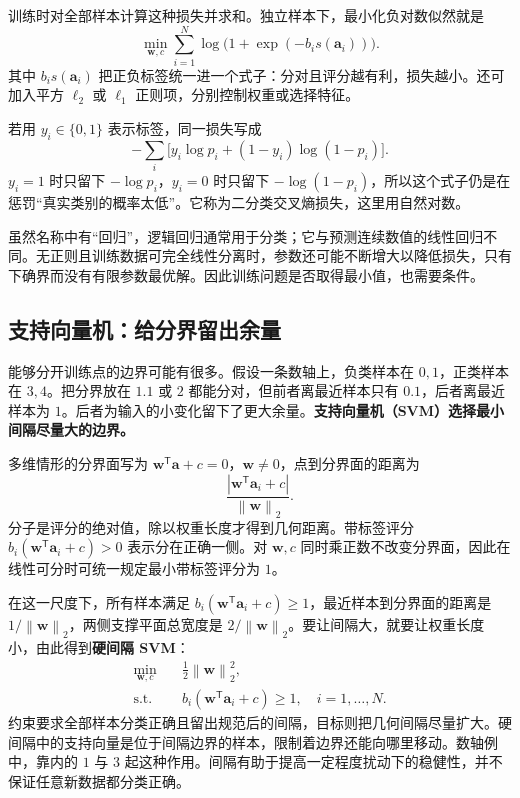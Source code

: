 \documentclass[UTF8,fontset=fandol,a4paper,12pt]{ctexart}
\newcommand{\va}{\boldsymbol a}
\newcommand{\vw}{\boldsymbol w}
\newcommand{\norm}[1]{\left\lVert#1\right\rVert}
\theoremstyle{definition}
\begin{document}
训练时对全部样本计算这种损失并求和。独立样本下，最小化负对数似然就是
\begin{equation}\label{eq:logistic}
 \boxed{\min_{\vw,c}\sum_{i=1}^N\log\bigl(1+\exp(-b_i s(\va_i))\bigr).}
\end{equation}
其中 $b_i s(\va_i)$ 把正负标签统一进一个式子：分对且评分越有利，损失越小。还可加入平方 $\ell_2$ 或 $\ell_1$ 正则项，分别控制权重或选择特征。

若用 $y_i\in\{0,1\}$ 表示标签，同一损失写成
\[
 -\sum_i\bigl[y_i\log p_i+(1-y_i)\log(1-p_i)\bigr].
\]
$y_i=1$ 时只留下 $-\log p_i$，$y_i=0$ 时只留下 $-\log(1-p_i)$，所以这个式子仍是在惩罚“真实类别的概率太低”。它称为二分类交叉熵损失，这里用自然对数。

虽然名称中有“回归”，逻辑回归通常用于分类；它与预测连续数值的线性回归不同。无正则且训练数据可完全线性分离时，参数还可能不断增大以降低损失，只有下确界而没有有限参数最优解。因此训练问题是否取得最小值，也需要条件。

\subsection{支持向量机：给分界留出余量}
能够分开训练点的边界可能有很多。假设一条数轴上，负类样本在 $0,1$，正类样本在 $3,4$。把分界放在 $1.1$ 或 $2$ 都能分对，但前者离最近样本只有 $0.1$，后者离最近样本为 $1$。后者为输入的小变化留下了更大余量。\textbf{支持向量机（SVM）选择最小间隔尽量大的边界。}

多维情形的分界面写为 $\vw^{\mathsf T}\va+c=0$，$\vw\ne0$，点到分界面的距离为
\[
 \frac{|\vw^{\mathsf T}\va_i+c|}{\norm{\vw}_2}.
\]
分子是评分的绝对值，除以权重长度才得到几何距离。带标签评分 $b_i(\vw^{\mathsf T}\va_i+c)>0$ 表示分在正确一侧。对 $\vw,c$ 同时乘正数不改变分界面，因此在线性可分时可统一规定最小带标签评分为 $1$。

在这一尺度下，所有样本满足 $b_i(\vw^{\mathsf T}\va_i+c)\ge1$，最近样本到分界面的距离是 $1/\norm{\vw}_2$，两侧支撑平面总宽度是 $2/\norm{\vw}_2$。要让间隔大，就要让权重长度小，由此得到\textbf{硬间隔 SVM}：
\[
 \boxed{\begin{aligned}
 \min_{\vw,c}\quad&\frac12\norm{\vw}_2^2,\\
 \text{s.t.}\quad&b_i(\vw^{\mathsf T}\va_i+c)\ge1,\quad i=1,\ldots,N.
 \end{aligned}}
\]
约束要求全部样本分类正确且留出规范后的间隔，目标则把几何间隔尽量扩大。硬间隔中的支持向量是位于间隔边界的样本，限制着边界还能向哪里移动。数轴例中，靠内的 $1$ 与 $3$ 起这种作用。间隔有助于提高一定程度扰动下的稳健性，并不保证任意新数据都分类正确。
\end{document}
